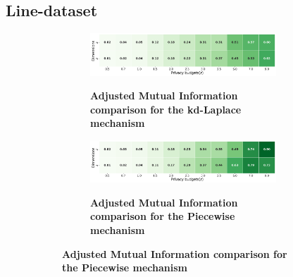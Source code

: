 \subsection{Line-dataset}
\begin{figure}[H]
      \centering
      \begin{subfigure}[b]{0.85\textwidth}
            \begin{subfigure}[c]{1\textwidth}
                  \caption{\textbf{Adjusted Mutual Information comparison for the kd-Laplace mechanism}}
                  \includegraphics[width=1\textwidth]{Results/kd-laplace/kd-Laplace/line-dataset/ami.png}
                  \label{fig:ami_line-dataset_comparison_kdlaplace_2d}
            \end{subfigure}
            \vfill %
            \begin{subfigure}[c]{1\textwidth}
                  \caption{\textbf{Adjusted Mutual Information comparison for the Piecewise mechanism}}
                  \includegraphics[width=1\textwidth]{Results/kd-laplace/piecewise/line-dataset/ami.png}
                  \label{fig:ami_line-dataset_comparison_piecewise_2d}
            \end{subfigure}
      \end{subfigure}
      \hfill %
      \begin{subfigure}[b]{0.075\textwidth}

\end{subfigure}
\end{figure}
